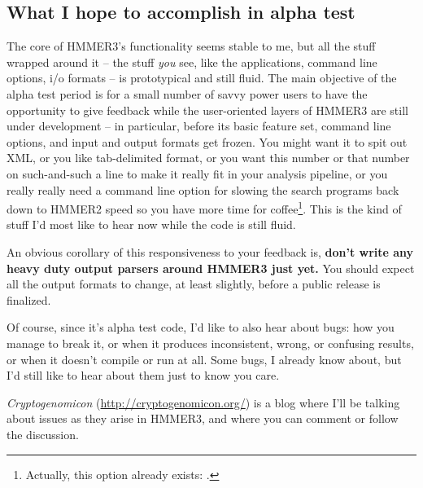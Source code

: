 \subsection{What I hope to accomplish in alpha test}

The core of HMMER3's functionality seems stable to me, but all the
stuff wrapped around it -- the stuff \emph{you} see, like the
applications, command line options, i/o formats -- is prototypical and
still fluid.  The main objective of the alpha test period is for a
small number of savvy power users to have the opportunity to give
feedback while the user-oriented layers of HMMER3 are still under
development -- in particular, before its basic feature set, command
line options, and input and output formats get frozen. You might want
it to spit out XML, or you like tab-delimited format, or you want this
number or that number on such-and-such a line to make it really fit in
your analysis pipeline, or you really really need a command line
option for slowing the search programs back down to HMMER2 speed so
you have more time for coffee\footnote{Actually, this option already
exists: .}. This is the kind of stuff I'd most like to
hear now while the code is still fluid.

\begin{sidebar}
An obvious corollary of this responsiveness to your feedback is,
\textbf{don't write any heavy duty output parsers around HMMER3 just
yet.} You should expect all the output formats to change, at least
slightly, before a public release is finalized.
\end{sidebar}

Of course, since it's alpha test code, I'd like to also hear about
bugs: how you manage to break it, or when it produces inconsistent,
wrong, or confusing results, or when it doesn't compile or run at all.
Some bugs, I already know about, but I'd still like to hear about them
just to know you care.

\emph{Cryptogenomicon}
(\url{http://cryptogenomicon.org/}) is a blog where
I'll be talking about issues as they arise in HMMER3, and where you
can comment or follow the discussion.





















  









